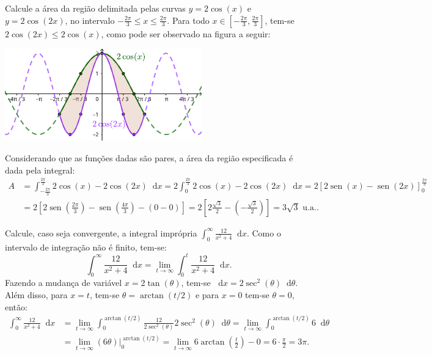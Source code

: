 \documentclass[12pt,a4paper]{article}
\newcommand*\diff{\mathop{}\!\mathrm{d}}
\newcommand*\sen{\operatorname{sen}}
\begin{document}
\begin{ExerciseList}
\Exercise[title={2,5}] Calcule a área da região delimitada pelas curvas $y=2\cos(x)$ e $y=2\cos(2x)$, no intervalo $-\frac{2\pi}{3}\leq x\leq \frac{2\pi}{3}$.
\Answer Para todo $x \in [-\frac{2\pi}{3}, \frac{2\pi}{3}]$, tem-se $2\cos(2x) \leq 2\cos(x)$, como pode ser observado na figura a seguir:

\begin{center}
  \includegraphics[height=4cm]{img/região-entre-trigonométricas.pdf}
\end{center}

Considerando que as funções dadas são pares, a área da região especificada é dada pela integral:
\begin{align*}
  A
  & = \int_{-\frac{2\pi}{3}}^{\frac{2\pi}{3}} 2\cos(x) -2\cos(2x)\diff{x}
    = 2\int_{0}^{\frac{2\pi}{3}} 2\cos(x) -2\cos(2x)\diff{x}
    = 2 \left[2\sen(x) - \sen(2x)\right]_{0}^{\frac{2\pi}{3}} \\
    & = 2 \left[2\sen\left(\frac{2\pi}{3}\right) - \sen\left(\frac{4\pi}{3}\right) - (0 - 0)\right]
    = 2 \left[2\frac{\sqrt{3}}{2} - \left(-\frac{\sqrt{3}}{2}\right)\right]
    = \boxed{3 \sqrt{3} \text{ u.a.}}.
\end{align*}

\Exercise[title={2,5}] Calcule, caso seja convergente, a integral imprópria $\int_{0}^\infty \frac{12}{x^2+4} \diff{x}$.
\Answer Como o intervalo de integração não é finito, tem-se:
\[
  \int_{0}^\infty \frac{12}{x^2+4} \diff{x}
  = \lim_{t\to \infty} \int_0^t \frac{12}{x^2+4} \diff{x}.
\]
Fazendo a mudança de variável $x=2\tan(\theta)$, tem-se $\diff{x} = 2\sec^2(\theta)\diff{\theta}$. Além disso, para $x=t$, tem-se $\theta = \arctan(t/2)$ e para $x=0$ tem-se $\theta=0$, então:
\begin{align*}
  \int_{0}^\infty \frac{12}{x^2+4} \diff{x}
  & = \lim_{t\to \infty} \int_0^{\arctan(t/2)} \frac{12}{2\sec^2(\theta)} 2\sec^2(\theta)\diff{\theta}
  = \lim_{t\to \infty} \int_0^{\arctan(t/2)} 6 \diff{\theta} \\
  & = \lim_{t\to \infty} (6\theta)\bigg|_{0}^{\arctan(t/2)}
  = \lim_{t\to \infty} 6\arctan\left(\frac{t}{2}\right) - 0
  = 6\cdot \frac{\pi}{2}
  = \boxed{3\pi}.
\end{align*}


\end{ExerciseList}
\end{document}
